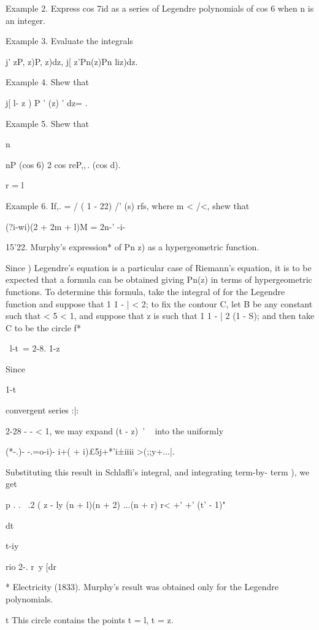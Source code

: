 {{Example 2. Express cos 7id as a series of Legendre polynomials of cos
6 when n is an integer.

Example 3. Evaluate the integrals

j' zP, z)P, z)dz, j[ z'Pn(z)Pn liz)dz.

Example 4. Shew that

j[ l- z ) P ' (z) ' dz= . 

Example 5. Shew that

n

nP (cos 6) 2 cos reP,,\,. (cos d).

r = l

Example 6. If,. = / ( 1 - 22) /' (s) rfs, where m < /<, shew that

(?i-wi)(2 + 2m + l)M = 2n-' -i- 

15'22. Murphy's expression* of Pn z) as a hypergeometric function.

Since ) Legendre's equation is a particular case of Riemann's
equation, it is to be expected that a formula can be obtained giving
Pn(z) in terms of hypergeometric functions. To determine this formula,
take the integral of for the Legendre function and suppose that
1 1 - | < 2; to fix the contour C, let B be any constant such that <
5 < 1, and suppose that z is such that 1 1 - | 2 (1 - S); and then
take C to be the circle f*

\ l-t\ = 2-8. 1-z

Since

1-t

convergent series :|:

2-28 - - < 1, we may expand (t - z)~' ~ into the uniformly

(*-.)- -.=o-i)- i+( + i)£5j+*'i±iiii >(;;y+...|.

Substituting this result in Schlafli's integral, and integrating
term-by- term ), we get

p . . \ .2 ( z - ly (n + l)(n + 2) ...(n + r) r< +' +' (t' - 1)"

dt

 t-iy

rio 2-. r\ y [dr

* Electricity (1833). Murphy's result was obtained only for the
Legendre polynomials.

t This circle contains the points t = l, t = z.

}}
